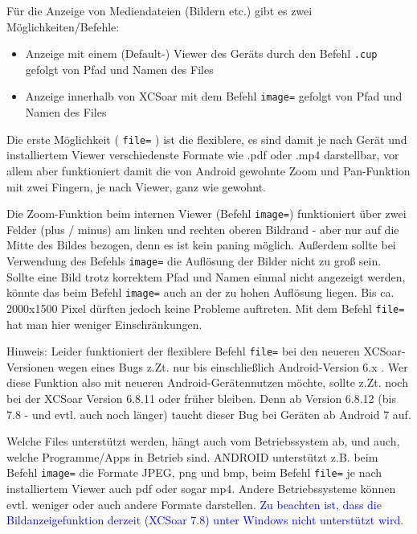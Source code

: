 Für die Anzeige von Mediendateien (Bildern etc.) gibt es zwei Möglichkeiten/Befehle:

\begin{itemize}
\item Anzeige mit einem (Default-) Viewer des Geräts durch den Befehl \verb|.cup| gefolgt von Pfad und Namen des Files
\item Anzeige innerhalb von XCSoar mit dem Befehl \verb|image=| gefolgt von Pfad und Namen des Files
\end{itemize}



Die erste Möglichkeit ( \verb|file=| ) ist die flexiblere, es sind damit je nach Gerät und installiertem Viewer verschiedenste Formate wie .pdf oder .mp4 darstellbar, vor allem aber funktioniert damit die von Android gewohnte Zoom und Pan-Funktion mit zwei Fingern, je nach Viewer, ganz wie gewohnt. 

Die Zoom-Funktion beim internen Viewer (Befehl \verb|image=|) funktioniert über zwei Felder (plus / minus) am linken und rechten oberen Bildrand - aber nur auf die Mitte des Bildes bezogen, denn es ist kein paning möglich. Außerdem sollte bei Verwendung des Befehls \verb|image=| die Auflösung der Bilder nicht zu groß sein. 
Sollte eine Bild trotz korrektem Pfad und Namen einmal nicht angezeigt werden, könnte das beim Befehl \verb|image=| auch an der zu hohen Auflösung liegen. Bis ca. 2000x1500 Pixel dürften jedoch keine Probleme auftreten. Mit dem Befehl \verb|file=| hat man hier weniger Einschränkungen. 

%
Hinweis: 
Leider funktioniert der flexiblere Befehl \verb|file=| bei den neueren XCSoar-Versionen wegen eines Bugs z.Zt. nur bis einschließlich Android-Version 6.x . Wer diese Funktion also mit neueren Android-Gerätennutzen möchte, sollte z.Zt. noch bei der XCSoar Version 6.8.11 oder früher bleiben. Denn ab Version 6.8.12 (bis 7.8 - und evtl. auch noch länger) taucht dieser Bug bei Geräten ab Android 7 auf.
% 
% 

Welche Files unterstützt werden, hängt auch vom Betriebssystem ab, und auch, welche Programme/Apps
in Betrieb sind. ANDROID unterstützt z.B. beim Befehl \verb|image=| die Formate JPEG, png und bmp, beim Befehl \verb|file=| je nach installiertem Viewer auch pdf oder sogar mp4.
Andere Betriebssysteme können evtl. weniger oder auch andere Formate darstellen.
\textcolor{blue}{Zu beachten ist, dass die Bildanzeigefunktion derzeit (XCSoar 7.8) unter Windows nicht unterstützt wird.} 

